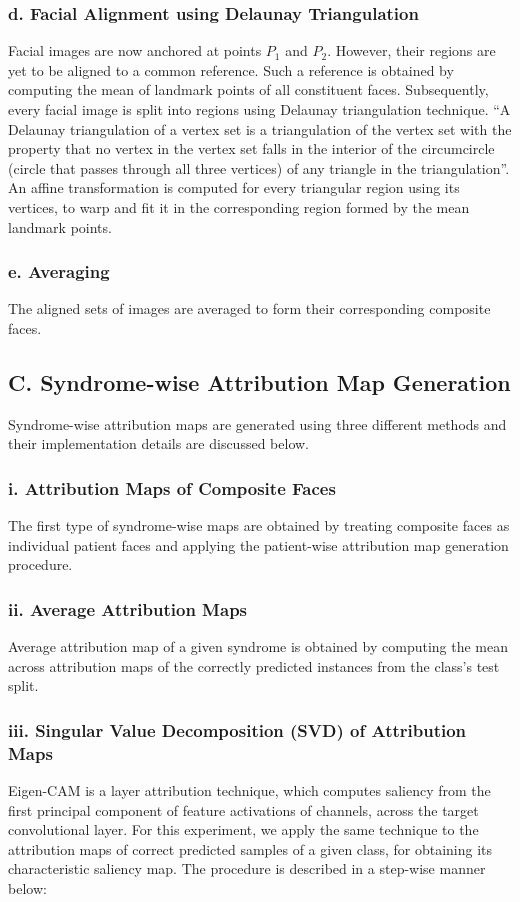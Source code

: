 \documentclass[../report.tex]{subfiles}
\begin{document}
    \subsubsection{d. Facial Alignment using Delaunay Triangulation}
    Facial images are now anchored at points $P_{1}$ and $P_{2}$. However, their regions are yet to be aligned to a common reference. Such a reference is obtained by computing the mean of landmark points of all constituent faces. Subsequently, every facial image is split into regions using Delaunay triangulation technique. \enquote{A Delaunay triangulation of a vertex set is a triangulation of the vertex set with the property that no vertex in the vertex set falls in the interior of the circumcircle (circle that passes through all three vertices) of any triangle in the triangulation}\cite{cmu_triangle:_nodate}. An affine transformation is computed for every triangular region using its vertices, to warp and fit it in the corresponding region formed by the mean landmark points.
    
    \subsubsection{e. Averaging}
    The aligned sets of images are averaged to form their corresponding composite faces.
    
    \subsection{C. Syndrome-wise Attribution Map Generation}
    Syndrome-wise attribution maps are generated using three different methods and their implementation details are discussed below.
    \subsubsection{i. Attribution Maps of Composite Faces}
    The first type of syndrome-wise maps are obtained by treating composite faces as individual patient faces and applying the patient-wise attribution map generation procedure.
    \subsubsection{ii. Average Attribution Maps}
    Average attribution map of a given syndrome is obtained by computing the mean across attribution maps of the correctly predicted instances from the class's test split.
    \subsubsection{iii. Singular Value Decomposition (SVD) of Attribution Maps}
	Eigen-CAM \cite{muhammad2020eigen} is a layer attribution technique, which computes saliency from the first principal component of feature activations of channels, across the target convolutional layer. For this experiment, we apply the same technique to the attribution maps of correct predicted samples of a given class, for obtaining its characteristic saliency map. The procedure is described in a step-wise manner below:
\end{document}
